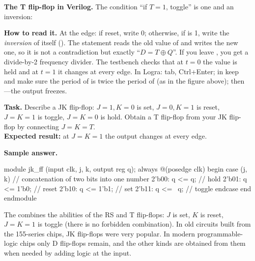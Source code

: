 \textbf{The T flip-flop in Verilog.} The condition ``if $T=1$, toggle'' is one
 and an inversion:


\textbf{How to read it.} At the edge: if reset, write 0; otherwise, if  is
1, write the \emph{inversion} of itself (). The statement
 reads the old value of  and writes the new one, so it is
not a contradiction but exactly ``$D=T\oplus Q$''. If you leave ,
you get a divide-by-2 frequency divider. The testbench  checks
that at $t=0$ the value is held and at $t=1$ it changes at every edge. In Logra:
 tab, Ctrl+Enter; in  keep  and make sure
the period of  is twice the period of  (as in the figure
above); then ---the output freezes.

\begin{diybox}
\textbf{Task.}  Describe a JK flip-flop: $J=1,K=0$ is set,
$J=0,K=1$ is reset, $J=K=1$ is toggle, $J=K=0$ is hold.  Obtain a T
flip-flop from your JK flip-flop by connecting $J=K=T$.\\
\textbf{Expected result:} at $J=K=1$ the output changes at every edge.
\end{diybox}

\textbf{Sample answer.}
\begin{vcode}
module jk_ff (input clk, j, k, output reg q);
    always @(posedge clk) begin
        case ({j, k})                 // concatenation of two bits into one number
            2'b00: q <= q;            // hold
            2'b01: q <= 1'b0;         // reset
            2'b10: q <= 1'b1;         // set
            2'b11: q <= ~q;           // toggle
        endcase
    end
endmodule
\end{vcode}

The  combines the abilities of the RS and T flip-flops: $J$ is
set, $K$ is reset, $J = K = 1$ is toggle (there is no forbidden combination). In
old circuits built from the 155-series chips, JK flip-flops were very
popular. In modern programmable-logic chips only D flip-flops remain, and the
other kinds are obtained from them when needed by adding logic at the input.

